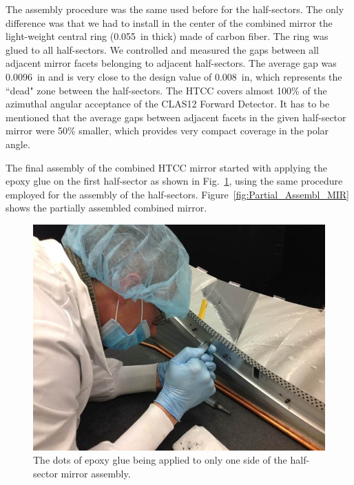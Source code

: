 The assembly procedure was the same used before for the half-sectors. The only difference was that we had to
install in the center of the combined mirror the light-weight central ring (0.055~in thick) made of carbon fiber.
The ring was glued to all half-sectors. We controlled and measured the gaps between all adjacent mirror facets
belonging to adjacent half-sectors. The average gap was 0.0096~in and is very close to the design value of
0.008~in, which represents the ``dead" zone between the half-sectors. The HTCC covers almost 100\% of the
azimuthal angular acceptance of the CLAS12 Forward Detector. It has to be mentioned that the average gaps
between adjacent facets in the given half-sector mirror were 50\% smaller, which provides very compact coverage
in the polar angle. 

The final assembly of the combined HTCC mirror started with applying the epoxy glue on the first half-sector as
shown in Fig.~\ref{fig:Ap_Gl_Half_Sect}, using the same procedure employed for the assembly of the
half-sectors. Figure~\ref{fig:Partial_Assembl_MIR} shows the partially assembled combined mirror.
 
\begin{figure}[ht]
    \centering
    \includegraphics[width=1.0\linewidth]{images/Ap_Gl_Half_Sect.jpg}
    \caption{The dots of epoxy glue being applied to only one side of the half-sector mirror assembly.}
    \label{fig:Ap_Gl_Half_Sect}
\end{figure}
 
